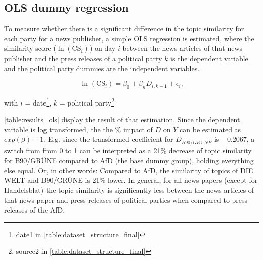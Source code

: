 \documentclass[
]{article}
\begin{document}
\hypertarget{ols-dummy-regression}{%
\subsection{OLS dummy regression}\label{ols-dummy-regression}}

To measure whether there is a significant difference in the topic
similarity for each party for a news publisher, a simple OLS regression
is estimated, where the similarity score (\(\ln(\text{CS}_{i})\)) on day
\(i\) between the news articles of that news publisher and the press
releases of a political party \(k\) is the dependent variable and the
political party dummies are the independent variables.

\[
\ln(\text{CS}_{i})=\beta_0+\beta_nD_{i,k-1}+\epsilon_i\text{,}
\]

with \(i\) = date\footnote{date1 in
  \autoref{table:dataset_structure_final}}, \(k\) = political
party\footnote{source2 in \autoref{table:dataset_structure_final}}

\autoref{table:results_ols} display the result of that estimation. Since
the dependent variable is log transformed, the the \% impact of \(D\) on
\(Y\) can be estimated as \(exp(\beta)-1\). E.g. since the transformed
coefficient for \(D_{B90/GRÜNE}\) is \(-0.2067\), a switch from from 0
to 1 can be interpreted as a 21\% decrease of topic similarity for
B90/GRÜNE compared to AfD (the base dummy group), holding everything
else equal. Or, in other words: Compared to AfD, the similarity of
topics of DIE WELT and B90/GRÜNE is 21\% lower. In general, for all news
papers (except for Handelsblat) the topic similarity is significantly
less between the news articles of that news paper and press releases of
political parties when compared to press releases of the AfD.
\end{document}
